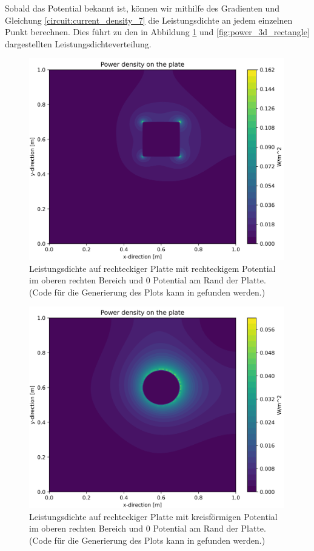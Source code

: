 Sobald das Potential bekannt ist, können wir mithilfe des Gradienten und Gleichung \eqref{circuit:current_density_7} die Leistungsdichte an jedem einzelnen Punkt berechnen. Dies führt zu den in Abbildung \ref{fig:power_2d} und \ref{fig:power_3d_rectangle} dargestellten Leistungsdichteverteilung.
\begin{figure}[h]
	\centering
	\includegraphics[width=0.99\textwidth]{papers/circuit/power_distribution-resized.png}
	\caption{Leistungsdichte auf rechteckiger Platte mit rechteckigem Potential im oberen rechten Bereich und 0 Potential am Rand der Platte. (Code für die Generierung des Plots kann in \cite{github:AndreasFMueller} gefunden werden.)}
	\label{fig:power_2d}
\end{figure}%
\begin{figure}[h]
	\centering
	\includegraphics[width=0.99\textwidth]{papers/circuit/power_distribution_circle-resized.png}
	\caption{Leistungsdichte auf rechteckiger Platte mit kreisförmigen Potential im oberen rechten Bereich und 0 Potential am Rand der Platte. (Code für die Generierung des Plots kann in \cite{github:AndreasFMueller} gefunden werden.)}
	\label{fig:power_2d_circle}
\end{figure}%
